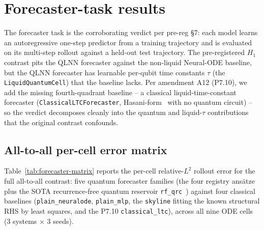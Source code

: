 
\section{Forecaster-task results}
\label{sec:forecaster}

The forecaster task is the corroborating verdict per pre-reg \S7:
each model learns an autoregressive one-step predictor from a
training trajectory and is evaluated on its multi-step rollout
against a held-out test trajectory. The pre-registered $H_1$
contrast pits the QLNN forecaster against the non-liquid
Neural-ODE baseline, but the QLNN forecaster has learnable
per-qubit time constants $\tau$ (the
\texttt{LiquidQuantumCell}) that the baseline lacks. Per amendment
A12 (P7.10), we add the missing fourth-quadrant baseline -- a
classical liquid-time-constant forecaster
(\texttt{ClassicalLTCForecaster},
Hasani-form~\cite{hasani2021liquid} with no quantum circuit) -- so
the verdict decomposes cleanly into the quantum and liquid-$\tau$
contributions that the original contrast confounds.

\subsection{All-to-all per-cell error matrix}
\label{sec:forecaster-cells}

Table~\ref{tab:forecaster-matrix} reports the per-cell relative-$L^2$
rollout error for the full all-to-all contrast: five quantum
forecaster families (the four registry ansätze plus the SOTA
recurrence-free quantum reservoir
\texttt{rf\_qrc}~\cite{ahmed2024rfqrc}) against four classical
baselines (\texttt{plain\_neuralode}, \texttt{plain\_mlp}, the
\texttt{skyline} fitting the known structural RHS by least
squares, and the P7.10 \texttt{classical\_ltc}), across all nine
ODE cells (3 systems $\times$ 3 seeds).

